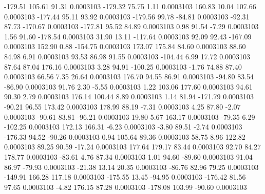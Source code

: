      -179.51      105.61       91.31     0.0003103
     -179.32       75.75        1.11     0.0003103
      160.83       10.04      107.66     0.0003103
     -177.44       95.11       93.92     0.0003103
     -179.56       99.78      -84.81     0.0003103
      -92.31       87.73     -170.67     0.0003103
     -177.81       95.52       84.89     0.0003103
        0.98       91.54       -7.29     0.0003103
        1.56       91.60     -178.54     0.0003103
       31.90       13.11     -117.64     0.0003103
       92.09       92.43     -167.09     0.0003103
      152.90        0.88     -154.75     0.0003103
      173.07      175.84       84.60     0.0003103
       88.60       84.98        6.91     0.0003103
       93.53       86.98       91.55     0.0003103
     -104.44        6.99       17.72     0.0003103
       87.64       87.04      176.16     0.0003103
        3.28       94.91     -100.25     0.0003103
       -1.76       74.88       87.40     0.0003103
       66.56        7.35       26.64     0.0003103
      176.70       94.55       86.91     0.0003103
      -94.80       83.54      -86.90     0.0003103
       91.76        2.30       -5.55     0.0003103
        1.22      103.06      177.60     0.0003103
       94.61       90.30        2.79     0.0003103
      176.14      100.44        8.89     0.0003103
        1.14       81.94     -171.79     0.0003103
      -90.21       96.55      173.42     0.0003103
      178.99       88.19       -7.31     0.0003103
        4.25       87.80       -2.07     0.0003103
      -90.61       83.81      -96.21     0.0003103
       19.80        5.67      163.17     0.0003103
      -79.35        6.29     -102.25     0.0003103
      172.13      166.31       -6.23     0.0003103
       -3.80       89.51       -2.74     0.0003103
     -176.33       94.52      -90.26     0.0003103
        0.94      105.64       89.36     0.0003103
       58.75        8.96      122.82     0.0003103
       89.25       90.59      -17.24     0.0003103
      177.64      179.17       83.44     0.0003103
       92.70       84.27      178.77     0.0003103
      -83.61        4.76       87.34     0.0003103
        1.01       94.60      -89.60     0.0003103
       91.04       86.97      -79.93     0.0003103
      -21.38       13.14       20.35     0.0003103
      -86.76       82.96       79.25     0.0003103
     -149.91      166.28      117.18     0.0003103
     -175.55       13.45      -94.95     0.0003103
     -176.42       81.56       97.65     0.0003103
       -4.82      176.15       87.28     0.0003103
     -178.08      103.99      -90.60     0.0003103

